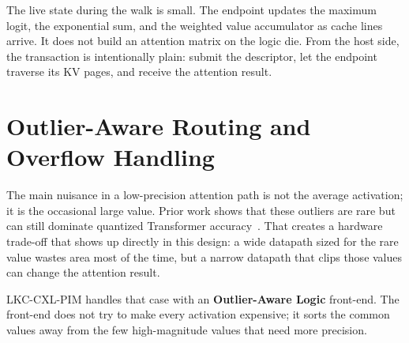 The live state during the walk is small. The endpoint updates the maximum logit, the exponential sum, and the weighted value accumulator as cache lines arrive. It does not build an attention matrix on the logic die. From the host side, the transaction is intentionally plain: submit the descriptor, let the endpoint traverse its KV pages, and receive the attention result.

\section{Outlier-Aware Routing and Overflow Handling}

The main nuisance in a low-precision attention path is not the average activation; it is the occasional large value. Prior work shows that these outliers are rare but can still dominate quantized Transformer accuracy~\cite{llm_outliers}. That creates a hardware trade-off that shows up directly in this design: a wide datapath sized for the rare value wastes area most of the time, but a narrow datapath that clips those values can change the attention result.

LKC-CXL-PIM handles that case with an \textbf{Outlier-Aware Logic} front-end. The front-end does not try to make every activation expensive; it sorts the common values away from the few high-magnitude values that need more precision.

